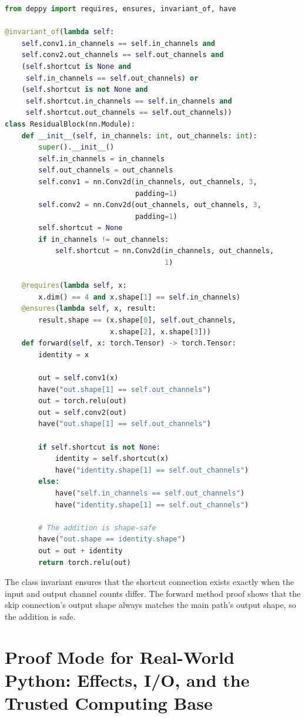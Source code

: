 \documentclass[11pt]{report}
\theoremstyle{definition}
\theoremstyle{plain}
\begin{document}
\begin{lstlisting}[style=deppy,language=Python]
from deppy import requires, ensures, invariant_of, have

@invariant_of(lambda self:
    self.conv1.in_channels == self.in_channels and
    self.conv2.out_channels == self.out_channels and
    (self.shortcut is None and
     self.in_channels == self.out_channels) or
    (self.shortcut is not None and
     self.shortcut.in_channels == self.in_channels and
     self.shortcut.out_channels == self.out_channels))
class ResidualBlock(nn.Module):
    def __init__(self, in_channels: int, out_channels: int):
        super().__init__()
        self.in_channels = in_channels
        self.out_channels = out_channels
        self.conv1 = nn.Conv2d(in_channels, out_channels, 3,
                               padding=1)
        self.conv2 = nn.Conv2d(out_channels, out_channels, 3,
                               padding=1)
        self.shortcut = None
        if in_channels != out_channels:
            self.shortcut = nn.Conv2d(in_channels, out_channels,
                                      1)

    @requires(lambda self, x:
        x.dim() == 4 and x.shape[1] == self.in_channels)
    @ensures(lambda self, x, result:
        result.shape == (x.shape[0], self.out_channels,
                         x.shape[2], x.shape[3]))
    def forward(self, x: torch.Tensor) -> torch.Tensor:
        identity = x

        out = self.conv1(x)
        have("out.shape[1] == self.out_channels")
        out = torch.relu(out)
        out = self.conv2(out)
        have("out.shape[1] == self.out_channels")

        if self.shortcut is not None:
            identity = self.shortcut(x)
            have("identity.shape[1] == self.out_channels")
        else:
            have("self.in_channels == self.out_channels")
            have("identity.shape[1] == self.out_channels")

        # The addition is shape-safe
        have("out.shape == identity.shape")
        out = out + identity
        return torch.relu(out)
\end{lstlisting}

The class invariant ensures that the shortcut connection exists exactly when
the input and output channel counts differ. The forward method proof shows
that the skip connection's output shape always matches the main path's output
shape, so the addition is safe.

\chapter{Proof Mode for Real-World Python: Effects, I/O, and the Trusted Computing Base}
\end{document}
